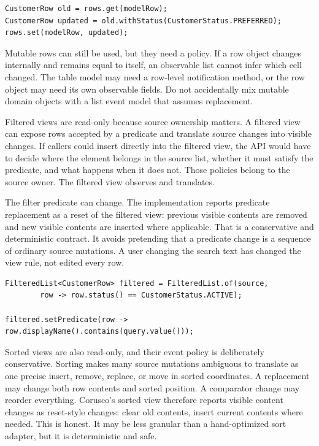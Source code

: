 \begin{lstlisting}[caption={Immutable row edit through replacement.}]
CustomerRow old = rows.get(modelRow);
CustomerRow updated = old.withStatus(CustomerStatus.PREFERRED);
rows.set(modelRow, updated);
\end{lstlisting}

Mutable rows can still be used, but they need a policy. If a row object changes
internally and remains equal to itself, an observable list cannot infer which
cell changed. The table model may need a row-level notification method, or the
row object may need its own observable fields. Do not accidentally mix mutable
domain objects with a list event model that assumes replacement.

Filtered views are read-only because source ownership matters. A filtered view
can expose rows accepted by a predicate and translate source changes into
visible changes. If callers could insert directly into the filtered view, the
API would have to decide where the element belongs in the source list, whether it
must satisfy the predicate, and what happens when it does not. Those policies
belong to the source owner. The filtered view observes and translates.

The filter predicate can change. The implementation reports predicate
replacement as a reset of the filtered view: previous visible contents are
removed and new visible contents are inserted where applicable. That is a
conservative and deterministic contract. It avoids pretending that a predicate
change is a sequence of ordinary source mutations. A user changing the search
text has changed the view rule, not edited every row.

\begin{lstlisting}[caption={Changing the filter policy resets the filtered view.}]
FilteredList<CustomerRow> filtered = FilteredList.of(source,
        row -> row.status() == CustomerStatus.ACTIVE);

filtered.setPredicate(row -> row.displayName().contains(query.value()));
\end{lstlisting}

Sorted views are also read-only, and their event policy is deliberately
conservative. Sorting makes many source mutations ambiguous to translate as one
precise insert, remove, replace, or move in sorted coordinates. A replacement
may change both row contents and sorted position. A comparator change may
reorder everything. Corusco's sorted view therefore reports visible content
changes as reset-style changes: clear old contents, insert current contents
where needed. This is honest. It may be less granular than a hand-optimized sort
adapter, but it is deterministic and safe.


